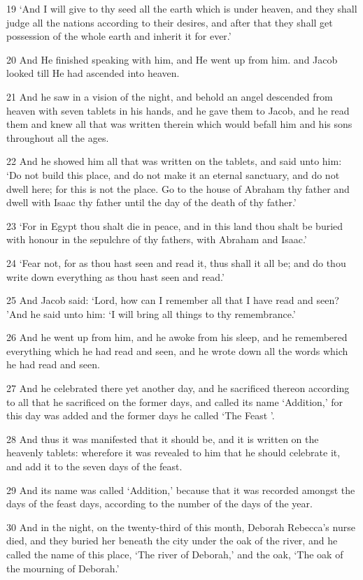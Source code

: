 \par 19 ‘And I will give to thy seed all the earth which is under heaven, and they shall judge all the nations according to their desires, and after that they shall get possession of the whole earth and inherit it for ever.’
\par 20 And He finished speaking with him, and He went up from him. and Jacob looked till He had ascended into heaven.
\par 21 And he saw in a vision of the night, and behold an angel descended from heaven with seven tablets in his hands, and he gave them to Jacob, and he read them and knew all that was written therein which would befall him and his sons throughout all the ages.
\par 22 And he showed him all that was written on the tablets, and said unto him: ‘Do not build this place, and do not make it an eternal sanctuary, and do not dwell here; for this is not the place. Go to the house of Abraham thy father and dwell with Isaac thy father until the day of the death of thy father.’
\par 23 ‘For in Egypt thou shalt die in peace, and in this land thou shalt be buried with honour in the sepulchre of thy fathers, with Abraham and Isaac.’
\par 24 ‘Fear not, for as thou hast seen and read it, thus shall it all be; and do thou write down everything as thou hast seen and read.’
\par 25 And Jacob said: ‘Lord, how can I remember all that I have read and seen? ’And he said unto him: ‘I will bring all things to thy remembrance.’
\par 26 And he went up from him, and he awoke from his sleep, and he remembered everything which he had read and seen, and he wrote down all the words which he had read and seen.
\par 27 And he celebrated there yet another day, and he sacrificed thereon according to all that he sacrificed on the former days, and called its name ‘Addition,’ for this day was added and the former days he called ‘The Feast ’.
\par 28 And thus it was manifested that it should be, and it is written on the heavenly tablets: wherefore it was revealed to him that he should celebrate it, and add it to the seven days of the feast.
\par 29 And its name was called ‘Addition,’ because that it was recorded amongst the days of the feast days, according to the number of the days of the year.
\par 30 And in the night, on the twenty-third of this month, Deborah Rebecca's nurse died, and they buried her beneath the city under the oak of the river, and he called the name of this place, ‘The river of Deborah,’ and the oak, ‘The oak of the mourning of Deborah.’
